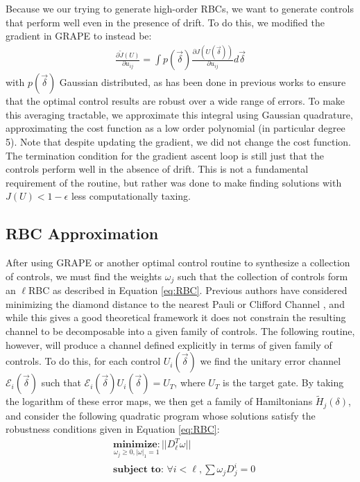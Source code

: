 \documentclass[aps,nofootinbib,pra,notitlepage,twocolumn]{revtex4-1}
\begin{document}
Because we our trying to generate high-order RBCs, we want to generate controls that perform well even in the presence of drift. To do this, we modified the gradient in GRAPE to instead be:
\begin{align}\label{quadrature}
\frac{\partial \tilde J(U)}{\partial u_{ij}} =
\int p(\vec{\delta})\frac{\partial J(U(\vec{\delta}))}{\partial u_{ij}} d\vec{\delta}
\end{align}
with $p(\vec{\delta})$ Gaussian distributed, as has been done in previous works \cite{Goerz2014} to ensure that the optimal control results are robust over a wide range of errors. To make this averaging tractable, we approximate this integral using Gaussian quadrature, approximating the cost function as a low order polynomial\cite{abramowiz1972handbook} (in particular degree 5). Note that despite updating the gradient, we did not change the cost function. The termination condition for the gradient ascent loop is still just that the controls perform well in the absence of drift. This is not a fundamental requirement of the routine, but rather was done to make finding solutions with $J(U) < 1 - \epsilon$  less computationally taxing.

 
\subsection{RBC Approximation}
After using GRAPE or another optimal control routine to synthesize a collection of controls, we must find the weights $\omega_j$ such that the collection of controls form an $\ell$RBC as described in Equation \ref{eq:RBC}. Previous authors have considered minimizing the diamond distance to the nearest Pauli or Clifford Channel \cite{Magesan2013}, and while this gives a good theoretical framework it does not constrain the resulting channel to be decomposable into a given family of controls. The following routine, however, will produce a channel defined explicitly in terms of given family of controls. To do this, for each control $U_i(\vec{\delta})$ we find the unitary error channel $\mathcal{E}_i(\vec{\delta})$ such that $\mathcal{E}_i(\vec{\delta})U_i(\vec{\delta})=U_T$, where $U_T$ is the target gate. By taking the logarithm of these error maps, we then get a family of Hamiltonians $\tilde{H}_j(\delta)$, and consider the following quadratic program whose solutions satisfy the robustness conditions given in Equation \ref{eq:RBC}:
\begin{equation}\label{eq:minimization}
  \begin{split}
    &\underset{\omega_j\geq0, |\omega|_1=1}{\textbf{minimize}: } ||D_{\ell}^T\omega||\\
    &\textbf{subject to: } \forall i<\ell, \sum \omega_jD_j^i=0\\
  \end{split}
\end{equation}
\end{document}
